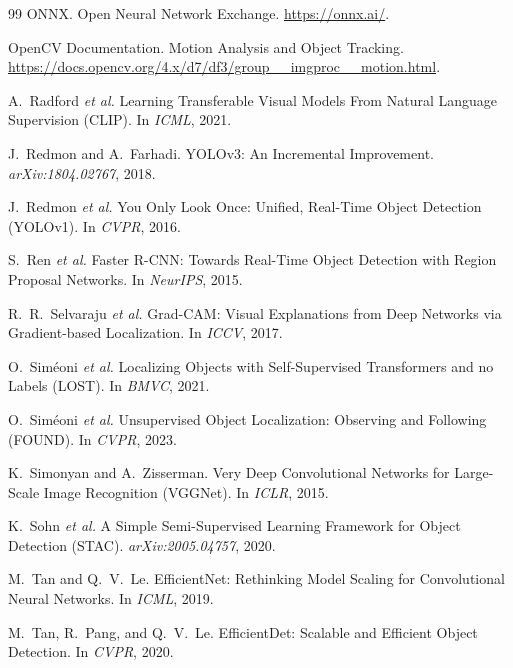 \begin{thebibliography}{99}
ONNX.
\newblock Open Neural Network Exchange.
\newblock \url{https://onnx.ai/}.

OpenCV Documentation.
\newblock Motion Analysis and Object Tracking.
\newblock \url{https://docs.opencv.org/4.x/d7/df3/group__imgproc__motion.html}.

A.~Radford \textit{et al.}
\newblock Learning Transferable Visual Models From Natural Language Supervision (CLIP).
\newblock In \textit{ICML}, 2021.

J.~Redmon and A.~Farhadi.
\newblock YOLOv3: An Incremental Improvement.
\newblock \textit{arXiv:1804.02767}, 2018.

J.~Redmon \textit{et al.}
\newblock You Only Look Once: Unified, Real-Time Object Detection (YOLOv1).
\newblock In \textit{CVPR}, 2016.

S.~Ren \textit{et al.}
\newblock Faster R-CNN: Towards Real-Time Object Detection with Region Proposal Networks.
\newblock In \textit{NeurIPS}, 2015.

R.~R.~Selvaraju \textit{et al.}
\newblock Grad-CAM: Visual Explanations from Deep Networks via Gradient-based Localization.
\newblock In \textit{ICCV}, 2017.

O.~Sim\'{e}oni \textit{et al.}
\newblock Localizing Objects with Self-Supervised Transformers and no Labels (LOST).
\newblock In \textit{BMVC}, 2021.

O.~Sim\'{e}oni \textit{et al.}
\newblock Unsupervised Object Localization: Observing and Following (FOUND).
\newblock In \textit{CVPR}, 2023.

K.~Simonyan and A.~Zisserman.
\newblock Very Deep Convolutional Networks for Large-Scale Image Recognition (VGGNet).
\newblock In \textit{ICLR}, 2015.

K.~Sohn \textit{et al.}
\newblock A Simple Semi-Supervised Learning Framework for Object Detection (STAC).
\newblock \textit{arXiv:2005.04757}, 2020.

M.~Tan and Q.~V.~Le.
\newblock EfficientNet: Rethinking Model Scaling for Convolutional Neural Networks.
\newblock In \textit{ICML}, 2019.

M.~Tan, R.~Pang, and Q.~V.~Le.
\newblock EfficientDet: Scalable and Efficient Object Detection.
\newblock In \textit{CVPR}, 2020.


\end{thebibliography}
